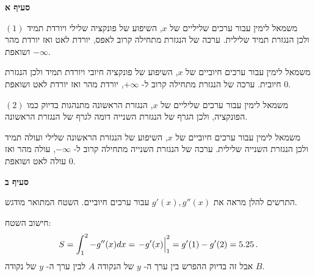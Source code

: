 \np

\textbf{סעיף א}

$(1)$
משמאל לימין עבור ערכים שליליים של 
$x$,
השיפוע של פונקציה שלילי ויורדת תמיד ולכן הנגזרת תמיד שלילית. ערכה של הנגזרת מתחילה קרוב לאפס, יורדת לאט ואז יורדת מהר ושואפת 
$-\infty$.

משמאל לימין עבור ערכים חיוביים של 
$x$,
השיפוע של פונקציה חיובי ויורדת תמיד ולכן הנגזרת חיובית. ערכה של הנגזרת מתחילה קרוב ל-%
$+\infty$,
יורדת מהר ואז יורדת לאט ושואפת 
$0$.


$(2)$
משמאל לימין עבור ערכים שליליים של 
$x$,
הנגזרת הראשונה מתנהגות בדיוק כמו הפונקציה, ולכן הגרף של הנגזרת השנייה דומה לגרף של הנגזרת הראשונה.

משמאל לימין עבור ערכים חיוביים של 
$x$,
השיפוע של הנגזרת הראשונה שלילי ועולה תמיד ולכן הנגזרת השנייה שלילית. ערכה של הנגזרת השנייה מתחילה קרוב ל-%
$-\infty$,
עולה מהר ואז עולה לאט ושואפת 
$0$.

\medskip

\textbf{סעיף ב}

התרשים להלן מראה את
$g'(x),g''(x)$
עבור ערכים חיוביים. השטח המתואר מודגש.

\begin{center}
\end{center}
חישוב השטח:
\[
S=\int_1^2 -g''(x) dx = \left.-g'(x)\rule{0pt}{12pt}\right|_1^2=g'(1)-g'(2)=5.25\,.
\]
אבל זה בדיוק ההפרש בין ערך ה-%
$y$
של הנקודה
$A$
לבין ערך ה-%
$y$
של נקודה 
$B$.

\medskip

